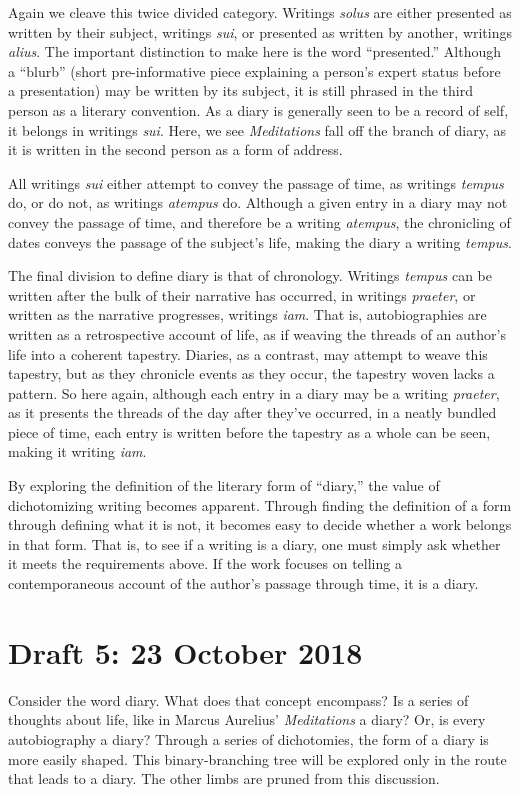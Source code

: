 \documentclass[12pt]{article}[titlepage]
\newcommand{\say}[1]{``#1''}
\newcommand{\1}{\={a}}
\newcommand{\2}{\={e}}
\newcommand{\3}{\={\i}}
\newcommand{\4}{\=o}
\newcommand{\5}{\=u}
\newcommand{\6}{\={A}}
\renewcommand{\,}{\textsuperscript{,}}
\begin{document}
Again we cleave this twice divided category.
Writings \textit{solus} are either presented as written by their subject, writings \textit{sui}, or presented as written by another, writings \textit{alius}.
The important distinction to make here is the word \say{presented.}
Although a \say{blurb} (short pre-informative piece explaining a person's expert status before a presentation) may be written by its subject, it is still phrased in the third person as a literary convention.
As a diary is generally seen to be a record of self, it belongs in writings \textit{sui}.
Here, we see \textit{Meditations} fall off the branch of diary, as it is written in the second person as a form of address. 

All writings \textit{sui} either attempt to convey the passage of time, as writings \textit{tempus} do, or do not, as writings \textit{atempus} do.
Although a given entry in a diary may not convey the passage of time, and therefore be a writing \textit{atempus}, the chronicling of dates conveys the passage of the subject's life, making the diary a writing \textit{tempus}.

The final division to define diary is that of chronology.
Writings \textit{tempus} can be written after the bulk of their narrative has occurred, in writings \textit{praeter}, or written as the narrative progresses, writings \textit{iam}.
That is, autobiographies are written as a retrospective account of life, as if weaving the threads of an  author's life into a coherent tapestry.
Diaries, as a contrast, may attempt to weave this tapestry, but as they chronicle events as they occur, the tapestry woven lacks a pattern.
So here again, although each entry in a diary may be a writing \textit{praeter}, as it presents the threads of the day after they've occurred, in a neatly bundled piece of time, each entry is written before the tapestry as a whole can be seen, making it writing \textit{iam}.

By exploring the definition of the literary form of \say{diary,} the value of dichotomizing writing becomes apparent.
Through finding the definition of a form through defining what it is not, it becomes easy to decide whether a work belongs in that form.
That is, to see if a writing is a diary, one must simply ask whether it meets the requirements above.
If the work focuses on telling a contemporaneous account of the author's passage through time, it is a diary.
 
\section{Draft 5: 23 October 2018}
Consider the word diary.
What does that concept encompass?
Is a series of thoughts about life, like in Marcus Aurelius' \textit{Meditations} a diary?
Or, is every autobiography a diary?
Through a series of dichotomies, the form of a diary is more easily shaped. 
This binary-branching tree will be explored only in the route that leads to a diary.
The other limbs are pruned from this discussion.
\end{document}
